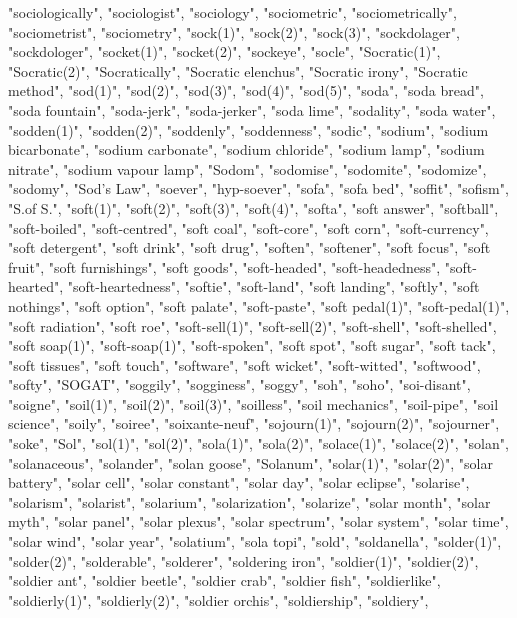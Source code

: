 "sociologically",
"sociologist",
"sociology",
"sociometric",
"sociometrically",
"sociometrist",
"sociometry",
"sock(1)",
"sock(2)",
"sock(3)",
"sockdolager",
"sockdologer",
"socket(1)",
"socket(2)",
"sockeye",
"socle",
"Socratic(1)",
"Socratic(2)",
"Socratically",
"Socratic elenchus",
"Socratic irony",
"Socratic method",
"sod(1)",
"sod(2)",
"sod(3)",
"sod(4)",
"sod(5)",
"soda",
"soda bread",
"soda fountain",
"soda-jerk",
"soda-jerker",
"soda lime",
"sodality",
"soda water",
"sodden(1)",
"sodden(2)",
"soddenly",
"soddenness",
"sodic",
"sodium",
"sodium bicarbonate",
"sodium carbonate",
"sodium chloride",
"sodium lamp",
"sodium nitrate",
"sodium vapour lamp",
"Sodom",
"sodomise",
"sodomite",
"sodomize",
"sodomy",
"Sod's Law",
"soever",
"hyp-soever",
"sofa",
"sofa bed",
"soffit",
"sofism",
"S.of S.",
"soft(1)",
"soft(2)",
"soft(3)",
"soft(4)",
"softa",
"soft answer",
"softball",
"soft-boiled",
"soft-centred",
"soft coal",
"soft-core",
"soft corn",
"soft-currency",
"soft detergent",
"soft drink",
"soft drug",
"soften",
"softener",
"soft focus",
"soft fruit",
"soft furnishings",
"soft goods",
"soft-headed",
"soft-headedness",
"soft-hearted",
"soft-heartedness",
"softie",
"soft-land",
"soft landing",
"softly",
"soft nothings",
"soft option",
"soft palate",
"soft-paste",
"soft pedal(1)",
"soft-pedal(1)",
"soft radiation",
"soft roe",
"soft-sell(1)",
"soft-sell(2)",
"soft-shell",
"soft-shelled",
"soft soap(1)",
"soft-soap(1)",
"soft-spoken",
"soft spot",
"soft sugar",
"soft tack",
"soft tissues",
"soft touch",
"software",
"soft wicket",
"soft-witted",
"softwood",
"softy",
"SOGAT",
"soggily",
"sogginess",
"soggy",
"soh",
"soho",
"soi-disant",
"soigne",
"soil(1)",
"soil(2)",
"soil(3)",
"soilless",
"soil mechanics",
"soil-pipe",
"soil science",
"soily",
"soiree",
"soixante-neuf",
"sojourn(1)",
"sojourn(2)",
"sojourner",
"soke",
"Sol",
"sol(1)",
"sol(2)",
"sola(1)",
"sola(2)",
"solace(1)",
"solace(2)",
"solan",
"solanaceous",
"solander",
"solan goose",
"Solanum",
"solar(1)",
"solar(2)",
"solar battery",
"solar cell",
"solar constant",
"solar day",
"solar eclipse",
"solarise",
"solarism",
"solarist",
"solarium",
"solarization",
"solarize",
"solar month",
"solar myth",
"solar panel",
"solar plexus",
"solar spectrum",
"solar system",
"solar time",
"solar wind",
"solar year",
"solatium",
"sola topi",
"sold",
"soldanella",
"solder(1)",
"solder(2)",
"solderable",
"solderer",
"soldering iron",
"soldier(1)",
"soldier(2)",
"soldier ant",
"soldier beetle",
"soldier crab",
"soldier fish",
"soldierlike",
"soldierly(1)",
"soldierly(2)",
"soldier orchis",
"soldiership",
"soldiery",
